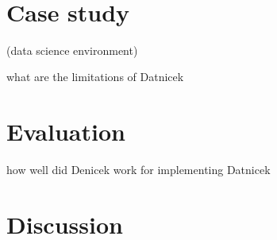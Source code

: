 \documentclass[sigconf,anonymous,screen]{acmart}
\begin{document}
~






\section{Case study}
\label{sec:case}
(data science environment)

what are the limitations of Datnicek

\section{Evaluation}
\label{sec:eval}
how well did Denicek work for implementing Datnicek

\section{Discussion}

\end{document}
